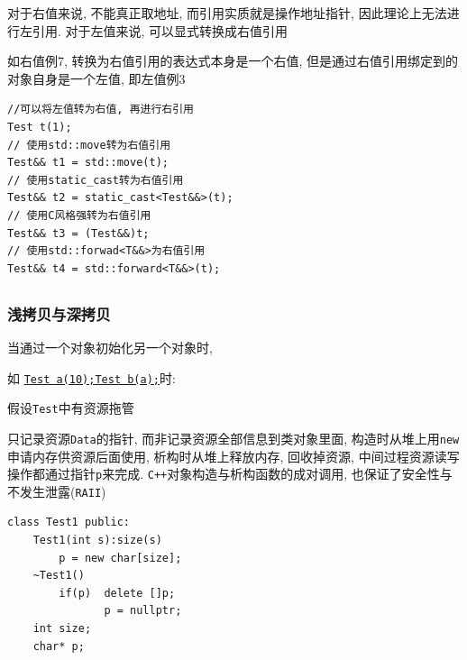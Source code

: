 \vspace*{2em}
\begin{paracol}{2}
	\begin{leftcolumn}
		对于右值来说, 不能真正取地址, 而引用实质就是操作地址指针, 因此理论上无法进行左引用. 对于左值来说, 
			可以显式转换成右值引用

		如右值例7, 转换为右值引用的表达式本身是一个右值, 但是通过右值引用绑定到的对象自身是一个左值, 即左值例3
	\end{leftcolumn}
	\begin{rightcolumn}
		\begin{lstlisting}[basicstyle=\small,columns=flexible,xleftmargin=5em,xrightmargin=5em]
//可以将左值转为右值, 再进行右引用
Test t(1);
// 使用std::move转为右值引用
Test&& t1 = std::move(t);
// 使用static_cast转为右值引用
Test&& t2 = static_cast<Test&&>(t);
// 使用C风格强转为右值引用
Test&& t3 = (Test&&)t;
// 使用std::forwad<T&&>为右值引用
Test&& t4 = std::forward<T&&>(t);
		\end{lstlisting}
	\end{rightcolumn}
\end{paracol}
\subsection{\color{purple}{移动语义与完美转发}}
\subsubsection{浅拷贝与深拷贝}
\begin{paracol}{2}
	
	\begin{leftcolumn}
	当通过一个对象初始化另一个对象时,

	如 \uline{{\tt Test a(10);}}\uline{{\tt Test b(a);}}时:

	假设{\tt Test}中有资源拖管
		
	只记录资源{\tt Data}的指针, 而非记录资源全部信息到类对象里面, 
		构造时从堆上用{\tt new}申请内存供资源后面使用, 析构时从堆上释放内存, 回收掉资源, 
		中间过程资源读写操作都通过指针{\tt p}来完成. {\tt C++}对象构造与析构函数的成对调用, 
		也保证了安全性与不发生泄露({\tt RAII})
	\end{leftcolumn}
	\begin{rightcolumn}
\begin{lstlisting}[xleftmargin=2em,xrightmargin=2em]
class Test1 public:
	Test1(int s):size(s) 
		p = new char[size];
	~Test1()
		if(p)  delete []p; 
			   p = nullptr;
	int size;
	char* p;
\end{lstlisting}	
	\end{rightcolumn}
\end{paracol}

